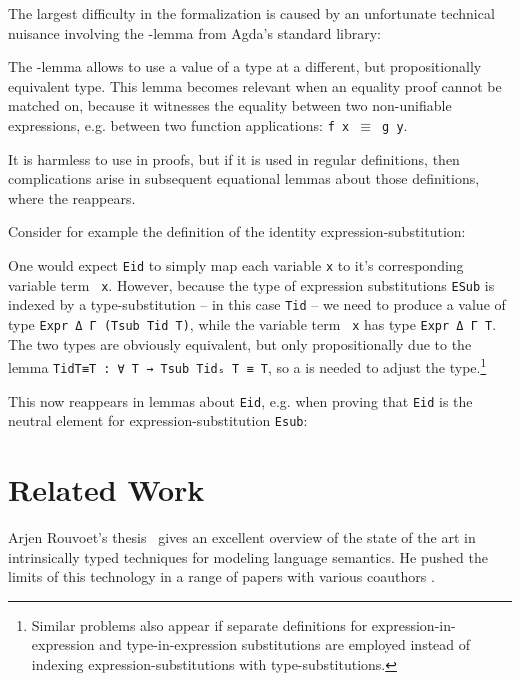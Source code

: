 \documentclass[acmsmall,anonymous,review,screen]{acmart}
\begin{document}
The largest difficulty in the formalization is caused by an unfortunate
technical nuisance involving the {\Asubst}-lemma from Agda's standard library:

\SubstExamplesDef

The {\Asubst}-lemma allows to use a value of a type at a different,
but propositionally equivalent type.
This lemma becomes relevant when an equality proof cannot be matched
on, because it witnesses the equality between two non-unifiable
expressions, e.g. between two function applications: \texttt{f x $\equiv$ g y}.

It is harmless to use {\Asubst} in proofs, but if it is used in
regular definitions, then complications arise in subsequent
equational lemmas about those definitions, where the {\Asubst}
reappears.


Consider for example the definition of the identity expression-substitution:
\SubstExamplesEidDef

One would expect \texttt{Eid} to simply map each variable \texttt{x}
to it's corresponding variable term \texttt{ x}.
However, because the type of expression substitutions \texttt{ESub} is
indexed by a type-substitution -- in this case \texttt{Tid} -- we need
to produce a value of type \texttt{Expr Δ Γ (Tsub Tid T)}, while
the variable term \texttt{ x} has type \texttt{Expr Δ Γ T}.
The two types are obviously equivalent, but only propositionally due
to the lemma \texttt{TidT≡T : ∀ T → Tsub Tidₛ T ≡ T}, so a
{\Asubst} is needed to adjust the type.\footnote{
  Similar problems also appear if separate definitions for
  expression-in-expression and type-in-expression substitutions are
  employed instead of indexing expression-substitutions with type-substitutions.
}

This {\Asubst} now reappears in lemmas about \texttt{Eid}, e.g. when proving
that \texttt{Eid} is the neutral element for expression-substitution \texttt{Esub}:
\SubstExamplesEidNeutral




\section{Related Work}
\label{sec:related-work}

Arjen Rouvoet's thesis~\cite{DBLP:phd/basesearch/Rouvoet21} gives an
excellent overview of the state of the art in intrinsically typed
techniques for modeling language semantics. He pushed the limits of
this technology in a range of papers with various coauthors
\cite{DBLP:journals/pacmpl/RestPRVM22,DBLP:journals/pacmpl/RouvoetKV21,DBLP:conf/cpp/RouvoetPKV20,DBLP:journals/pacmpl/PoulsenRTKV18}. 
\end{document}
